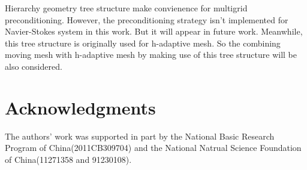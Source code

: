 \documentclass[mathpazo]{aamm}
\begin{document}
   Hierarchy geometry tree structure make convienence for multigrid
   preconditioning. However, the preconditioning strategy isn't
   implemented for Navier-Stokes system in this work. But it will
   appear in future work. Meanwhile, this tree structure is originally
   used for h-adaptive mesh. So the combining moving mesh with
   h-adaptive mesh by making use of this tree structure will be also
   considered.
 
    
   

\section*{Acknowledgments}
The authors' work was supported in part by the National Basic Research
Program of China(2011CB309704) and the National Natrual Science
Foundation of China(11271358 and 91230108).
   




 
\end{document}
